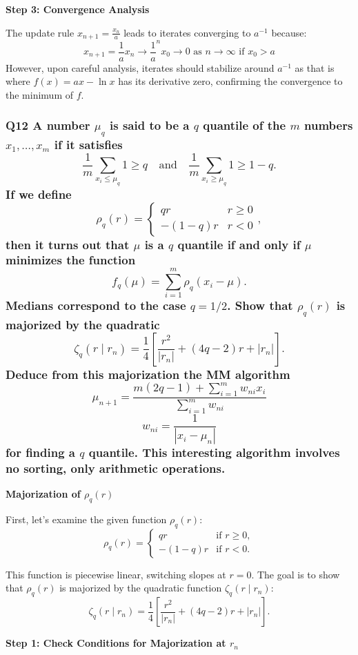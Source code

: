 \documentclass[8pt]{article}
\begin{document}
{\textbf{Step 3: Convergence Analysis}

The update rule \( x_{n+1} = \frac{x_n}{a} \) leads to iterates converging to \( a^{-1} \) because:
\[
x_{n+1} = \frac{1}{a}x_n \rightarrow \frac{1}{a}^n x_0 \rightarrow 0 \text{ as } n \rightarrow \infty \text{ if } x_0 > a
\]
However, upon careful analysis, iterates should stabilize around \( a^{-1} \) as that is where \( f(x) = ax - \ln x \) has its derivative zero, confirming the convergence to the minimum of \( f \).

\subsubsection*{Q12 A number \(\mu_q\) is said to be a \(q\) quantile of the \(m\) numbers \(x_1, \ldots, x_m\) if it satisfies
\[
\frac{1}{m} \sum_{x_i \leq \mu_q} 1 \geq q \quad \text{and} \quad \frac{1}{m} \sum_{x_i \geq \mu_q} 1 \geq 1 - q.
\]
If we define
\[
\rho_q(r) = \begin{cases} 
qr & r \geq 0 \\ 
-(1 - q)r & r < 0 
\end{cases},
\]
then it turns out that \(\mu\) is a \(q\) quantile if and only if \(\mu\) minimizes the function
\[
f_q(\mu) = \sum_{i=1}^m \rho_q(x_i - \mu).
\]
Medians correspond to the case \(q = 1/2\). Show that \(\rho_q(r)\) is majorized by the quadratic
\[
\zeta_q(r \mid r_n) = \frac{1}{4} \left[ \frac{r^2}{|r_n|} + (4q - 2)r + |r_n| \right].
\]
Deduce from this majorization the MM algorithm
\[
\mu_{n+1} = \frac{m(2q - 1) + \sum_{i=1}^m w_{ni} x_i}{\sum_{i=1}^m w_{ni}}
\]
\[
w_{ni} = \frac{1}{|x_i - \mu_n|}
\]
for finding a \(q\) quantile. This interesting algorithm involves no sorting, only arithmetic operations.}

\textbf{Majorization of \(\rho_q(r)\)}

First, let's examine the given function \(\rho_q(r)\):
\[
\rho_q(r) = \begin{cases} 
qr & \text{if } r \geq 0, \\ 
-(1 - q)r & \text{if } r < 0.
\end{cases}
\]

This function is piecewise linear, switching slopes at \(r = 0\). The goal is to show that \(\rho_q(r)\) is majorized by the quadratic function \(\zeta_q(r \mid r_n)\):
\[
\zeta_q(r \mid r_n) = \frac{1}{4} \left[ \frac{r^2}{|r_n|} + (4q - 2)r + |r_n| \right].
\]

\textbf{Step 1: Check Conditions for Majorization at \(r_n\)}

}
\end{document}
